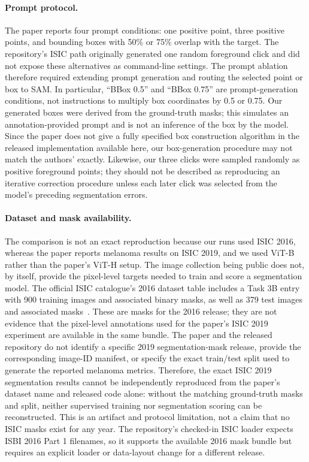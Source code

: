 \paragraph{Prompt protocol.}
The paper reports four prompt conditions: one positive point, three positive
points, and bounding boxes with 50\% or 75\% overlap with the target. The
repository's ISIC path originally generated one random foreground click and
did not expose these alternatives as command-line settings. The prompt
ablation therefore required extending prompt generation and routing the
selected point or box to SAM. In particular, ``BBox 0.5'' and ``BBox 0.75''
are prompt-generation conditions, not instructions to multiply box coordinates
by 0.5 or 0.75. Our generated boxes were derived from the ground-truth masks;
this simulates an annotation-provided prompt and is not an inference of the
box by the model. Since the paper does not give a fully specified box
construction algorithm in the released implementation available here, our
box-generation procedure may not match the authors' exactly. Likewise, our
three clicks were sampled randomly as positive foreground points; they should
not be described as reproducing an iterative correction procedure unless each
later click was selected from the model's preceding segmentation errors.

\paragraph{Dataset and mask availability.}
The comparison is not an exact reproduction because our runs used ISIC 2016,
whereas the paper reports melanoma results on ISIC 2019, and we used ViT-B
rather than the paper's ViT-H setup. The image collection being public does
not, by itself, provide the pixel-level targets needed to train and score a
segmentation model. The official ISIC catalogue's 2016 dataset table includes a Task 3B entry with
900 training images and associated binary masks, as well as 379 test images
and associated masks~\cite{isicdata}. These are masks for the 2016 release;
they are not evidence that the pixel-level annotations used for the paper's
ISIC 2019 experiment are available in the same bundle. The paper and the
released repository do not identify a specific 2019 segmentation-mask
release, provide the corresponding image-ID manifest, or specify the exact
train/test split used to generate the reported melanoma metrics. Therefore,
the exact ISIC 2019 segmentation results cannot be independently reproduced
from the paper's dataset name and released code alone: without the matching
ground-truth masks and split, neither supervised training nor segmentation
scoring can be reconstructed. This is an artifact and protocol limitation,
not a claim that no ISIC masks exist for any year. The repository's checked-in
ISIC loader expects ISBI 2016 Part 1 filenames, so it supports the available
2016 mask bundle but requires an explicit loader or data-layout change for a
different release.

